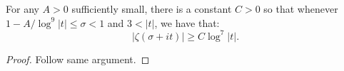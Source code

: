 \begin{lemma}[ZetaLowerBnd]
\label{ZetaLowerBnd}
\leanok
For any $A>0$ sufficiently small, there is a constant $C>0$ so that
  whenever $1- A / \log^9 |t| \le \sigma < 1$ and $3 < |t|$, we have that:
  $$
  |\zeta(\sigma+it)| \ge C \log^7 |t|.
  $$
\end{lemma}
\begin{proof}
\leanok
Follow same argument.
\end{proof}

